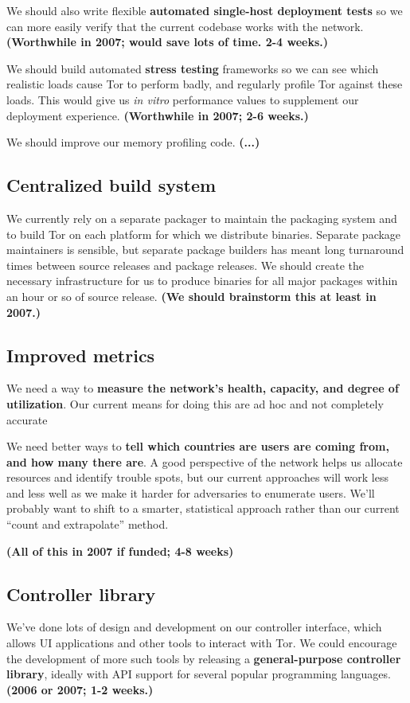 \documentclass{article}
\newcommand{\tmp}[1]{{\bf #1} [......] \\}
\newcommand{\plan}[1]{ {\bf (#1)}}
\begin{document}
We should also write flexible {\bf automated single-host deployment tests} so
we can more easily verify that the current codebase works with the
network.\plan{Worthwhile in 2007; would save lots of time.  2-4 weeks.}

We should build automated {\bf stress testing} frameworks so we can see which
realistic loads cause Tor to perform badly, and regularly profile Tor against
these loads.  This would give us {\it in vitro} performance values to
supplement our deployment experience.\plan{Worthwhile in 2007; 2-6 weeks.}

We should improve our memory profiling code.\plan{...}


\subsection{Centralized build system}
We currently rely on a separate packager to maintain the packaging system and
to build Tor on each platform for which we distribute binaries.  Separate
package maintainers is sensible, but separate package builders has meant
long turnaround times between source releases and package releases.  We
should create the necessary infrastructure for us to produce binaries for all
major packages within an hour or so of source release.\plan{We should
  brainstorm this at least in 2007.}

\subsection{Improved metrics}
We need a way to {\bf measure the network's health, capacity, and degree of
  utilization}.  Our current means for doing this are ad hoc and not
completely accurate

We need better ways to {\bf tell which countries are users are coming from,
  and how many there are}.  A good perspective of the network helps us
allocate resources and identify trouble spots, but our current approaches
will work less and less well as we make it harder for adversaries to
enumerate users.  We'll probably want to shift to a smarter, statistical
approach rather than our current ``count and extrapolate'' method.

\plan{All of this in 2007 if funded; 4-8 weeks}


\subsection{Controller library}
We've done lots of design and development on our controller interface, which
allows UI applications and other tools to interact with Tor.  We could
encourage the development of more such tools by releasing a {\bf
  general-purpose controller library}, ideally with API support for several
popular programming languages.\plan{2006 or 2007; 1-2 weeks.}
\end{document}
